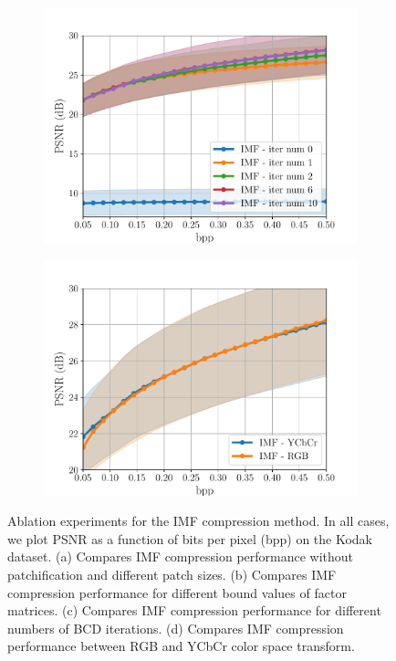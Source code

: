 \begin{figure}[t]
    \begin{subfigure}{.5\textwidth}
		\centering
		\includegraphics[width=.95\textwidth]{figures/ablation_iternum_psnr.pdf}
		\caption{}
		\label{fig: iteration ablation psnr-vs-bpp}
	\end{subfigure}%
	\begin{subfigure}{.5\textwidth}
		\centering
		\includegraphics[width=.95\textwidth]{figures/ablation_colorspace_psnr.pdf}
		\caption{}
		\label{fig: colorspace ablation psnr-vs-bpp}
	\end{subfigure}
	\caption{Ablation experiments for the IMF compression method. In all cases, we plot PSNR as a function of bits per pixel (bpp) on the Kodak dataset. (a) Compares IMF compression performance without patchification and different patch sizes. (b) Compares IMF compression performance for different bound values of factor matrices. (c) Compares IMF compression performance for different numbers of BCD iterations. (d) Compares IMF compression performance between RGB and YCbCr color space transform.}
	\label{fig: ablation studies}
\end{figure}


